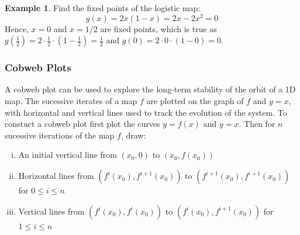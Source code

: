 \documentclass[11pt]{article}
\theoremstyle{definition}
\newtheorem{exmp}{Example}[section]
\begin{document}
\begin{exmp}
Find the fixed points of the logistic map: \[g(x) = 2x(1-x) = 2x - 2x^2 = 0\] Hence, $x = 0$ and $x = 1/2$ are fixed points, which is true as $g(\frac{1}{2}) = 2 \cdot \frac{1}{2} \cdot (1 - \frac{1}{2}) = \frac{1}{2}$ and $g(0) = 2 \cdot 0 \cdot (1 - 0) = 0$.
\end{exmp}

\subsubsection{Cobweb Plots}
A cobweb plot can be used to explore the long-term stability of the orbit of a 1D map. The sucessive iterates of a map $f$ are plotted on the graph of $f$ and $y = x$, with horizontal and vertical lines used to track the evolution of the system. To constuct a cobweb plot first plot the curves $y = f(x)$ and $y = x$. Then for $n$ sucessive iterations of the map $f$, draw:
\begin{enumerate}[i.]
    \item An initial vertical line from $(x_0, 0)$ to $(x_0, f(x_0))$
    \item Horizontal lines from $(f^i(x_0), f^{i+1}(x_0))$ to $(f^{i+1}(x_0), f^{i+1}(x_0))$ for $0 \leq i \leq n$
    \item Vertical lines from $(f^i(x_0), f^i(x_0))$ to $(f^i(x_0), f^{i+1}(x_0))$ for $1 \leq i \leq n$
\end{enumerate}
\end{document}
